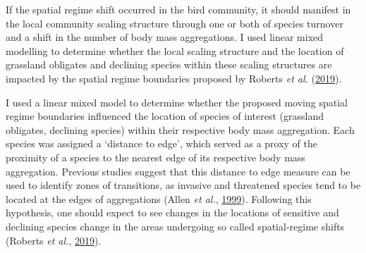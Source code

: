 \documentclass[print]{nuthesis}
\begin{document}
If the spatial regime shift occurred in the bird community, it should manifest in the local community scaling structure through one or both of species turnover and a shift in the number of body mass aggregations. I used linear mixed modelling to determine whether the local scaling structure and the location of grassland obligates and declining species within these scaling structures are impacted by the spatial regime boundaries proposed by Roberts \emph{et al.} (\protect\hyperlink{ref-roberts2019shifting}{2019}).

I used a linear mixed model to determine whether the proposed moving spatial regime boundaries influenced the location of species of interest (grassland obligates, declining species) within their respective body mass aggregation. Each species was assigned a `distance to edge', which served as a proxy of the proximity of a species to the nearest edge of its respective body mass aggregation. Previous studies suggest that this distance to edge measure can be used to identify zones of transitions, as invasive and threatened species tend to be located at the edges of aggregations (Allen \emph{et al.}, \protect\hyperlink{ref-allen1999body}{1999}). Following this hypothesis, one should expect to see changes in the locations of sensitive and declining species change in the areas undergoing so called spatial-regime shifts (Roberts \emph{et al.}, \protect\hyperlink{ref-roberts2019shifting}{2019}).
\end{document}
